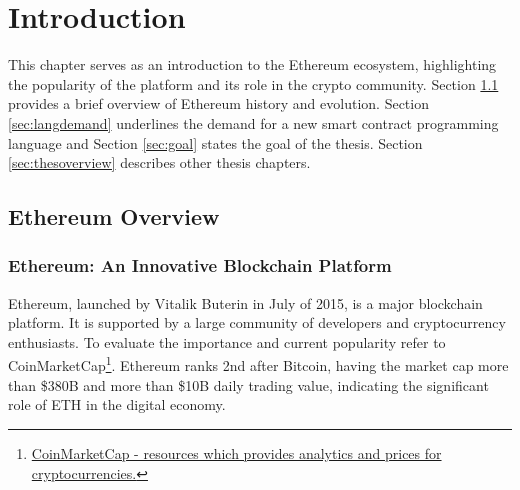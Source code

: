 \chapter{Introduction}
\label{chap:intro}



This chapter serves as an introduction to the Ethereum ecosystem, highlighting the popularity of the platform and its role in the crypto community. 
Section \ref{sec:ethoverview} provides a brief overview of Ethereum history and evolution. Section \ref{sec:langdemand} underlines the demand for a new smart contract programming language and Section \ref{sec:goal} states the goal of the thesis. Section \ref{sec:thesoverview} describes other thesis chapters.


\section{Ethereum Overview}
\label{sec:ethoverview}

\subsection{Ethereum: An Innovative Blockchain Platform}
Ethereum, launched by Vitalik Buterin in July of 2015, is a major blockchain platform. It is supported by a large community of developers and cryptocurrency enthusiasts. To evaluate the importance and current popularity refer to CoinMarketCap\footnote{\href{https://coinmarketcap.com/}{CoinMarketCap - resources which provides analytics and prices for cryptocurrencies.}}. Ethereum ranks 2nd after Bitcoin, having the market cap more than \$380B and more than \$10B daily trading value, indicating the significant role of ETH in the digital economy.

